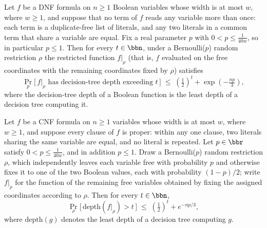 \begin{theorem}
\label{SwitchingBernoulli.switching_bernoulli_dtDepth_dnf}
\leanok
{}
Let $f$ be a DNF formula on $n \ge 1$ Boolean variables whose width is at most $w$,
where $w \ge 1$, and suppose that no term of $f$ reads any variable more than once: each
term is a duplicate-free list of literals, and any two literals in a common term that
share a variable are equal. Fix a real parameter $p$ with $0 < p \le \tfrac{1}{40w}$, so
in particular $p \le 1$. Then for every $t \in \bbn$, under a Bernoulli($p$) random
restriction $\rho$ the restricted function $f\vert_\rho$ (that is, $f$ evaluated on the
free coordinates with the remaining coordinates fixed by $\rho$) satisfies
\[
\Pr_{p}\big[\, f\vert_\rho \text{ has decision-tree depth exceeding } t \,\big] \;\le\;
\left(\tfrac12\right)^{t} + \exp\!\left(-\tfrac{np}{3}\right),
\]
where the decision-tree depth of a Boolean function is the least depth of a decision
tree computing it.
\end{theorem}

\begin{theorem}
\label{SwitchingBernoulli.switching_bernoulli_dtDepth_cnf}
\leanok
{}
Let $f$ be a CNF formula on $n \ge 1$ variables whose width is at most $w$, where $w \ge
1$, and suppose every clause of $f$ is proper: within any one clause, two literals
sharing the same variable are equal, and no literal is repeated. Let $p \in \bbr$
satisfy $0 < p \le \tfrac{1}{40w}$, and in addition $p \le 1$. Draw a Bernoulli($p$)
random restriction $\rho$, which independently leaves each variable free with
probability $p$ and otherwise fixes it to one of the two Boolean values, each with
probability $(1-p)/2$; write $f\vert_\rho$ for the function of the remaining free
variables obtained by fixing the assigned coordinates according to $\rho$. Then for
every $t \in \bbn$,
\[
  \Pr_\rho\big[\,\mathrm{depth}(f\vert_\rho) > t\,\big]
    \;\le\; \left(\tfrac12\right)^{t} + e^{-np/3},
\]
where $\mathrm{depth}(g)$ denotes the least depth of a decision tree computing $g$.
\end{theorem}

